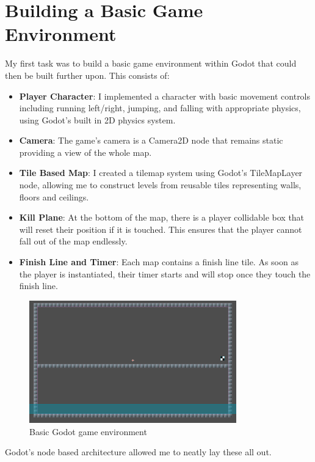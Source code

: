 \section{Building a Basic Game Environment}

My first task was to build a basic game environment within Godot that could then be built further upon.
This consists of:
\begin{itemize}
    \item \textbf{Player Character}: I implemented a character with basic movement controls including running left/right, jumping, and falling with appropriate physics, using Godot's built in 2D physics system.
    \item \textbf{Camera}: The game's camera is a Camera2D node that remains static providing a view of the whole map.
    \item \textbf{Tile Based Map}: I created a tilemap system using Godot's TileMapLayer node, allowing me to construct levels from reusable tiles representing walls, floors and ceilings.
    \item \textbf{Kill Plane}: At the bottom of the map, there is a player collidable box that will reset their position if it is touched. This ensures that the player cannot fall out of the map endlessly.
    \item \textbf{Finish Line and Timer}: Each map contains a finish line tile. As soon as the player is instantiated, their timer starts and will stop once they touch the finish line.
\end{itemize}

\begin{figure}[H]
    \centering
    \includegraphics[width=0.8\textwidth]{figures/godot_environment_basic}
    \caption{Basic Godot game environment}
    \label{fig:godot_environment_basic}
\end{figure}

Godot's node based architecture allowed me to neatly lay these all out.

